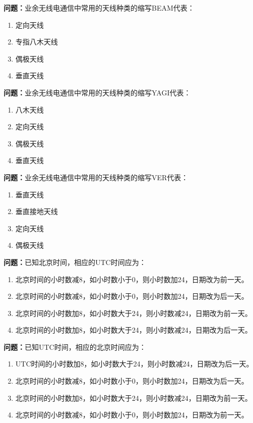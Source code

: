 \documentclass{ctexbook}
\begin{document}
\textbf{问题：}业余无线电通信中常用的天线种类的缩写BEAM代表：
\begin{enumerate}[label=\Alph*), leftmargin=3em]
\item 定向天线
\item 专指八木天线
\item 偶极天线
\item 垂直天线
\end{enumerate}

\textbf{问题：}业余无线电通信中常用的天线种类的缩写YAGI代表：
\begin{enumerate}[label=\Alph*), leftmargin=3em]
\item 八木天线
\item 定向天线
\item 偶极天线
\item 垂直天线
\end{enumerate}

\textbf{问题：}业余无线电通信中常用的天线种类的缩写VER代表：
\begin{enumerate}[label=\Alph*), leftmargin=3em]
\item 垂直天线
\item 垂直接地天线
\item 定向天线
\item 偶极天线
\end{enumerate}

\textbf{问题：}已知北京时间，相应的UTC时间应为：
\begin{enumerate}[label=\Alph*), leftmargin=3em]
\item 北京时间的小时数减8，如小时数小于0，则小时数加24，日期改为前一天。
\item 北京时间的小时数减8，如小时数小于0，则小时数加24，日期改为后一天。
\item 北京时间的小时数加8，如小时数大于24，则小时数减24，日期改为前一天。
\item 北京时间的小时数加8，如小时数大于24，则小时数减24，日期改为后一天。
\end{enumerate}

\textbf{问题：}已知UTC时间，相应的北京时间应为：
\begin{enumerate}[label=\Alph*), leftmargin=3em]
\item UTC时间的小时数加8，如小时数大于24，则小时数减24，日期改为后一天。
\item 北京时间的小时数减8，如小时数小于0，则小时数加24，日期改为后一天。
\item 北京时间的小时数加8，如小时数大于24，则小时数减24，日期改为前一天。
\item 北京时间的小时数减8，如小时数小于0，则小时数加24，日期改为前一天。
\end{enumerate}
\end{document}
